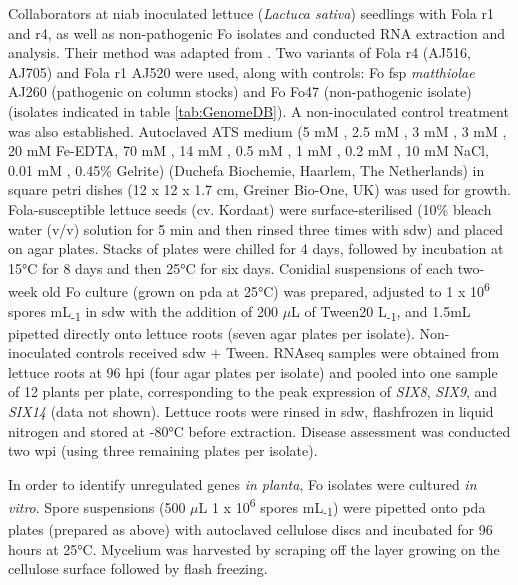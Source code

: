 Collaborators at \ac{niab} inoculated lettuce (\textit{Lactuca sativa}) seedlings with \ac{Fola} \ac{r1} and \ac{r4}, as well as non-pathogenic \ac{Fo} isolates and conducted RNA extraction and analysis. Their method was adapted from \textcite{Taylor2016}. Two variants of \ac{Fola} \ac{r4} (AJ516, AJ705) and \ac{Fola} \ac{r1} AJ520 were used, along with controls: \ac{Fo} \ac{fsp} \textit{matthiolae} AJ260 (pathogenic on column stocks) and \ac{Fo} Fo47 (non-pathogenic isolate) (isolates indicated in table \ref{tab:GenomeDB}). A non-inoculated control treatment was also established. Autoclaved ATS medium (5 mM , 2.5 mM , 3 mM , 3 mM , 20 mM Fe-EDTA, 70 mM , 14 mM , 0.5 mM , 1 mM , 0.2 mM , 10 mM NaCl, 0.01 mM , 0.45\% Gelrite) (Duchefa Biochemie, Haarlem, The Netherlands) in square petri dishes (12 x 12 x 1.7 cm, Greiner Bio-One, UK) was used for growth. \ac{Fola}-susceptible lettuce seeds (cv. Kordaat) were surface-sterilised (10\% bleach water (v/v) solution for 5 min and then rinsed three times with \ac{sdw}) and placed on agar plates. Stacks of plates were chilled for 4 days, followed by incubation at 15°C for 8 days and then 25°C for six days. Conidial suspensions of each two-week old \ac{Fo} culture (grown on \ac{pda} at 25°C) was prepared, adjusted to 1 x 10\textsuperscript{6} spores mL\textsubscript{-1} in \ac{sdw} with the addition of 200 \(\mu\)L of Tween20 L\textsubscript{-1}, and 1.5mL pipetted directly onto lettuce roots (seven agar plates per isolate). Non-inoculated controls received \ac{sdw} + Tween. RNAseq samples were obtained from lettuce roots at 96 \ac{hpi} (four agar plates per isolate) and pooled into one sample of 12 plants per plate, corresponding to the peak expression of \textit{SIX8}, \textit{SIX9}, and \textit{SIX14} (data not shown). Lettuce roots were rinsed in \ac{sdw}, flashfrozen in liquid nitrogen and stored at -80°C before extraction. Disease assessment was conducted two \ac{wpi} (using three remaining plates per isolate).

In order to identify unregulated genes \textit{in planta}, \ac{Fo} isolates were cultured \textit{in vitro}. Spore suspensions (500 \(\mu\)L 1 x 10\textsuperscript{6} spores mL\textsubscript{-1}) were pipetted onto \ac{pda} plates (prepared as above) with autoclaved cellulose discs and incubated for 96 hours at 25°C. Mycelium was harvested by scraping off the layer growing on the cellulose surface followed by flash freezing. 

